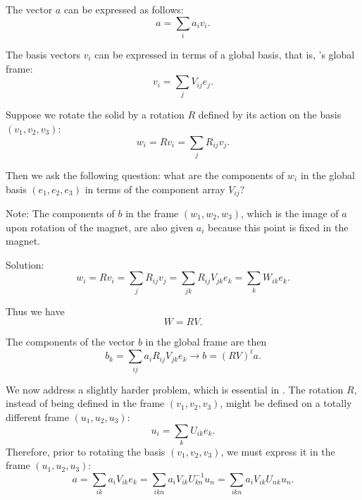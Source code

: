 The vector $a$ can be expressed as follows:
\begin{equation*}
  a = \sum_i  a_i v_i.
\end{equation*}

The basis vectors $v_i$ can be expressed in terms of a global basis, that is, \PTC's global frame:
\begin{equation*}
  v_i = \sum_j V_{ij} e_j.
\end{equation*}
 
Suppose we rotate the solid by a rotation $R$ defined by its action on the basis
$(v_1,v_2,v_3)$:
\begin{equation*}
  w_i = R v_i = \sum_j R_{ij} v_j.
\end{equation*}

Then we ask the following question: what are the components of $w_i$ in the global basis $(e_1,e_2,e_3)$ in terms of the component array $V_{ij}$?

Note: The components of $b$ in the frame $(w_1,w_2,w_3)$,
which is the image of $a$ upon rotation of the magnet, are
also given $a_i$ because this point is fixed in the magnet.

Solution:
\begin{equation*}
 w_i = R v_i = \sum_j R_{ij} v_j = \sum_{jk} R_{ij} V_{jk} e_k = \sum_k W_{ik} e_k.
\end{equation*}

Thus we have
\begin{equation*}
  W = RV.
\end{equation*}

The components of the vector $b$ in the global frame are then
\begin{equation*}
  b_k = \sum_{ij} a_i R_{ij} V_{jk} e_k
  \rightarrow b = (RV)^t a.
\end{equation*}

We now address a slightly harder problem, which is essential in \PTC.
The rotation $R$, instead of being defined in the frame $(v_1,v_2,v_3)$,
might be defined on a totally different frame $(u_1,u_2,u_3)$:
\begin{equation*}
  u_i = \sum_k U_{ik} e_k.
\end{equation*}
Therefore, prior to rotating the basis $(v_1,v_2,v_3)$, we must
express it in the frame $(u_1,u_2,u_3)$:
\begin{equation*}
  a = \sum_{ik} a_i V_{ik} e_k
    = \sum_{ikn} a_i V_{ik} U^{-1}_{kn} u_n
    = \sum_{ikn} a_i V_{ik} U_{nk} u_n.
\end{equation*}

